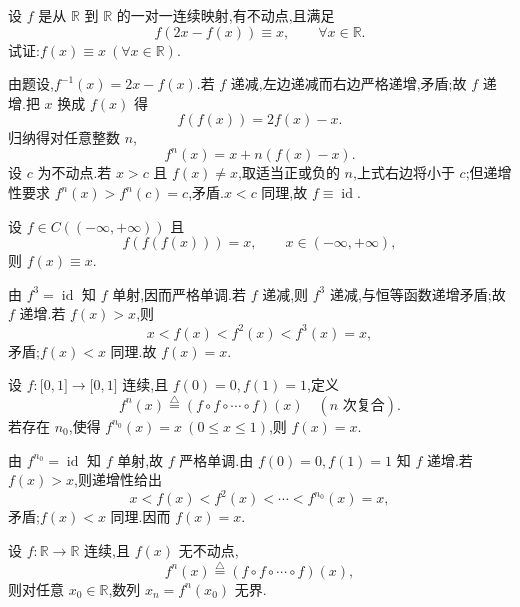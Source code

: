 \begin{example}
    设 $f$ 是从 $\mathbb{R}$ 到 $\mathbb{R}$ 的一对一连续映射,有不动点,且满足
    \[
        f(2x-f(x))\equiv x,
        \qquad \forall x\in\mathbb{R}.
    \]
    试证:$f(x)\equiv x\ (\forall x\in\mathbb{R})$.
\end{example}
\exampleblank

\begin{solution}
    由题设,$f^{-1}(x)=2x-f(x)$.若 $f$ 递减,左边递减而右边严格递增,矛盾;故 $f$ 递增.把 $x$ 换成 $f(x)$ 得
    \[
        f(f(x))=2f(x)-x.
    \]
    归纳得对任意整数 $n$,
    \[
        f^n(x)=x+n(f(x)-x).
    \]
    设 $c$ 为不动点.若 $x>c$ 且 $f(x)\ne x$,取适当正或负的 $n$,上式右边将小于 $c$;但递增性要求 $f^n(x)>f^n(c)=c$,矛盾.$x<c$ 同理,故 $f\equiv\operatorname{id}$.
\end{solution}

\begin{example}
    设 $f\in C(( -\infty,+\infty))$ 且
    \[
        f(f(f(x)))=x,
        \qquad x\in(-\infty,+\infty),
    \]
    则 $f(x)\equiv x$.
\end{example}
\exampleblank

\begin{solution}
    由 $f^3=\operatorname{id}$ 知 $f$ 单射,因而严格单调.若 $f$ 递减,则 $f^3$ 递减,与恒等函数递增矛盾;故 $f$ 递增.若 $f(x)>x$,则
    \[
        x<f(x)<f^2(x)<f^3(x)=x,
    \]
    矛盾;$f(x)<x$ 同理.故 $f(x)=x$.
\end{solution}

\begin{example}
    设 $f:\lbrack 0,1\rbrack\to\lbrack 0,1\rbrack$ 连续,且 $f(0)=0,f(1)=1$,定义
    \[
        f^n(x)\overset{\triangle}{=}(f\circ f\circ\cdots\circ f)(x)
        \quad(n\text{ 次复合}).
    \]
    若存在 $n_0$,使得 $f^{n_0}(x)=x\ (0\leq x\leq1)$,则 $f(x)=x$.
\end{example}
\exampleblank

\begin{solution}
    由 $f^{n_0}=\operatorname{id}$ 知 $f$ 单射,故 $f$ 严格单调.由 $f(0)=0,f(1)=1$ 知 $f$ 递增.若 $f(x)>x$,则递增性给出
    \[
        x<f(x)<f^2(x)<\cdots<f^{n_0}(x)=x,
    \]
    矛盾;$f(x)<x$ 同理.因而 $f(x)=x$.
\end{solution}

\begin{example}
    设 $f:\mathbb{R}\to\mathbb{R}$ 连续,且 $f(x)$ 无不动点,
    \[
        f^n(x)\overset{\triangle}{=}(f\circ f\circ\cdots\circ f)(x),
    \]
    则对任意 $x_0\in\mathbb{R}$,数列 $x_n=f^n(x_0)$ 无界.
\end{example}
\exampleblank

